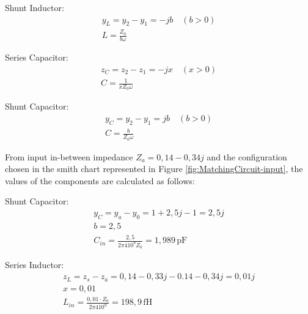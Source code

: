 Shunt Inductor:
\begin{equation}
    \begin{split}
       y_L = y_2 -  y_1 = -jb \quad(b > 0)\\
        L = \frac{Z_0}{b\omega} 
    \end{split}
    \label{eq:ShuntInductor}
\end{equation}

Series Capacitor:
\begin{equation}
    \begin{split}
        z_C = z_2 -  z_1 = -jx \quad(x > 0)\\
        C = \frac{1}{xZ_0\omega}
    \end{split}
    \label{eq:SeriesCapacitor}
\end{equation}

Shunt Capacitor:
\begin{equation}
    \begin{split}
        y_C = y_2 -  y_1 = jb \quad(b > 0)\\
        C = \frac{b}{Z_0\omega}
    \end{split}
    \label{eq:ShuntCapacitor}
\end{equation}

\vspace{0.4cm}
From input in-between impedance $Z_a = 0,14-0,34j$ and the configuration chosen in the smith chart represented in Figure \ref{fig:MatchingCircuit-input}, the values of the components are calculated as follows:

\vspace{0.4cm}
Shunt Capacitor:
\begin{equation}
    \begin{split}
        y_C =y_a-y_0 = 1+2,5j - 1 = 2,5j\\
        b = 2,5 \\
        C_{in} = \frac{2,5}{2\pi410^9Z_0} = 1,989\,\si{\pico\farad}
    \end{split}
    \label{eq:InputCap}
\end{equation}

Series Inductor:
\begin{equation}
    \begin{split}
        z_L = z_s - z_a = 0,14-0,33j - 0.14 - 0,34j = 0,01j\\
        x = 0,01 \\
        L_{in} = \frac{0,01\cdot Z_0}{2\pi410^9} = 198,9\,\si{\femto\henry}
    \end{split}
    \label{eq:InputInd}
\end{equation}

